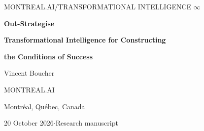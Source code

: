 \documentclass[11pt,letterpaper]{article}
\theoremstyle{remark}\newtheorem{remark}{Remark}[section]
\begin{document}
\thispagestyle{plain}
\begin{center}
{\small\sffamily\color{accent} MONTREAL.AI\quad /\quad TRANSFORMATIONAL INTELLIGENCE $\infty$\par}
\vspace{.75em}
{\fontsize{38}{42}\selectfont\bfseries\color{ink} Out-Strategise\hspace{.18em}{\chessfont ♟}\par}
\vspace{.6em}
{\Large\bfseries Transformational Intelligence for Constructing\par}
\vspace{.1em}
{\Large\bfseries the Conditions of Success\par}
\vspace{.85em}
{\large Vincent Boucher\par}
{MONTREAL.AI\par}
{Montréal, Québec, Canada\par}
\vspace{.5em}
{20 October 2026\quad$\cdot$\quad Research manuscript\par}
\end{center}
\end{document}
